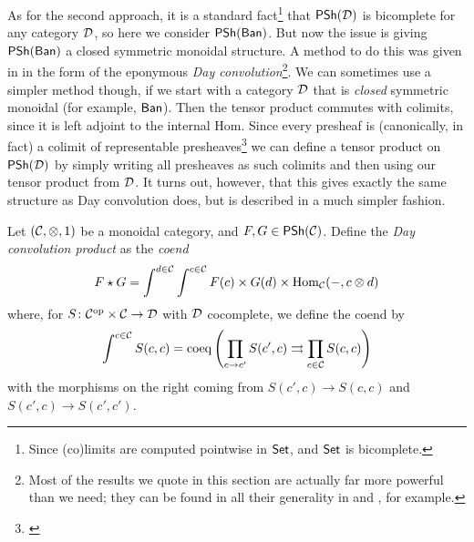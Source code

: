         As for the second approach, it is a standard fact\footnote{
            Since (co)limits are computed pointwise in $\mathsf{Set}$, and $\mathsf{Set}$ is bicomplete.
        } that $\mathsf{PSh}(\mathcal{D})$ is bicomplete for any category $\mathcal{D}$, so here we consider $\mathsf{PSh}(\mathsf{Ban})$.
        But now the issue is giving $\mathsf{PSh}(\mathsf{Ban})$ a closed symmetric monoidal structure.
        A method to do this was given in \cite{Day:ve} in the form of the eponymous \emph{Day convolution}\footnote{
            Most of the results we quote in this section are actually far more powerful than we need; they can be found in all their generality in \cite{Day:ve} and \cite{Anonymous:czsXyaOO}, for example.
        }.
        We can sometimes use a simpler method though, if we start with a category $\mathcal{D}$ that is \emph{closed} symmetric monoidal (for example, $\mathsf{Ban}$).
        Then the tensor product commutes with colimits, since it is left adjoint to the internal Hom.
        Since every presheaf is (canonically, in fact) a colimit of representable presheaves\footnote{
            \cite[Theorem~1,~\S III.7]{Lane:1998fe}
        } we can define a tensor product on $\mathsf{PSh}(\mathcal{D})$ by simply writing all presheaves as such colimits and then using our tensor product from $\mathcal{D}$.
        It turns out, however, that this gives exactly the same structure as Day convolution does, but is described in a much simpler fashion.



        \begin{definition}
            Let $(\mathcal{C},\otimes,1)$ be a monoidal category, and $F,G\in\mathsf{PSh}(\mathcal{C})$.
            Define the \emph{Day convolution product} as the \emph{coend}
            \begin{equation*}
                F\star G = \int^{d\in\mathcal{C}}\int^{c\in\mathcal{C}}F(c)\times G(d)\times\operatorname{Hom}_{\mathcal{C}}({-},c\otimes d)
            \end{equation*}
            where, for $S\colon{\mathcal{C}}^{\mathrm{op}}\times\mathcal{C}\to\mathcal{D}$ with $\mathcal{D}$ cocomplete, we define the coend by
            \begin{equation*}
                \int^{c\in\mathcal{C}}S(c,c) = \operatorname{coeq}\left(\prod_{c\to c'}S(c',c)\rightrightarrows\prod_{c\in\mathcal{C}} S(c,c)\right)
            \end{equation*}
            with the morphisms on the right coming from $S(c',c)\to S(c,c)$ and $S(c',c)\to S(c',c')$.
        \end{definition}

